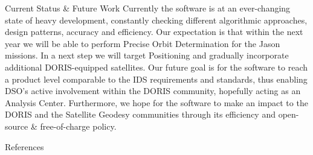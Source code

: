 \documentclass[final,a0,portrait]{beamer}
\newlength{\onecolwid}
\begin{document}
\begin{frame}[t]
\begin{columns}[t]
\begin{column}{\onecolwid}
\begin{block}{Current Status \& Future Work}
{\small
Currently the software is at an ever-changing state of heavy development, 
constantly checking different algorithmic approaches, design patterns, accuracy 
and efficiency. Our expectation is that within the next year we will be able 
to perform Precise Orbit Determination for the Jason missions. In a next step 
we will target Positioning and gradually incorporate additional DORIS-equipped 
satellites. Our future goal is for the software to reach a product level 
comparable to the IDS requirements and standards, thus enabling DSO's active 
involvement within the DORIS community, hopefully acting as an Analysis Center.
Furthermore, we hope for the software to make an impact to the DORIS and the 
Satellite Geodesy communities through its efficiency and open-source \& free-of-charge 
policy.
}
\end{block}


\begin{block}{References}

\nocite{*} %
\footnotesize{
\vspace{0.75in}}


\end{block}




\end{column} %

\end{columns} %

\end{frame} %
\end{document}
